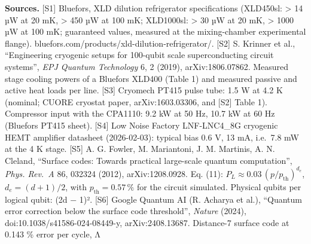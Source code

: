 \documentclass[
]{article}
\begin{document}
\textbf{Sources.} {[}S1{]} Bluefors, XLD dilution refrigerator
specifications (XLD450sl: \textgreater{} 14 µW at 20 mK, \textgreater{}
450 µW at 100 mK; XLD1000sl: \textgreater{} 30 µW at 20 mK,
\textgreater{} 1000 µW at 100 mK; guaranteed values, measured at the
mixing-chamber experimental flange).
b\allowbreak{}l\allowbreak{}u\allowbreak{}e\allowbreak{}f\allowbreak{}o\allowbreak{}r\allowbreak{}s\allowbreak{}.\allowbreak{}c\allowbreak{}o\allowbreak{}m\allowbreak{}/\allowbreak{}p\allowbreak{}r\allowbreak{}o\allowbreak{}d\allowbreak{}u\allowbreak{}c\allowbreak{}t\allowbreak{}s\allowbreak{}/\allowbreak{}x\allowbreak{}l\allowbreak{}d\allowbreak{}-\allowbreak{}d\allowbreak{}i\allowbreak{}l\allowbreak{}u\allowbreak{}t\allowbreak{}i\allowbreak{}o\allowbreak{}n\allowbreak{}-\allowbreak{}r\allowbreak{}e\allowbreak{}f\allowbreak{}r\allowbreak{}i\allowbreak{}g\allowbreak{}e\allowbreak{}r\allowbreak{}a\allowbreak{}t\allowbreak{}o\allowbreak{}r\allowbreak{}/\allowbreak{}.
{[}S2{]} S. Krinner et al., ``Engineering cryogenic setups for 100-qubit
scale superconducting circuit systems'', \emph{EPJ Quantum Technology}
6, 2 (2019), arXiv:1806.07862. Measured stage cooling powers of a
Bluefors XLD400 (Table 1) and measured passive and active heat loads per
line. {[}S3{]} Cryomech PT415 pulse tube: 1.5 W at 4.2 K (nominal; CUORE
cryostat paper, arXiv:1603.03306, and {[}S2{]} Table 1). Compressor
input with the CPA1110: 9.2 kW at 50 Hz, 10.7 kW at 60 Hz (Bluefors
PT415 sheet). {[}S4{]} Low Noise Factory LNF-LNC4\_8G cryogenic HEMT
amplifier datasheet (2026-02-03): typical bias 0.6 V, 13 mA, i.e.~7.8 mW
at the 4 K stage. {[}S5{]} A. G. Fowler, M. Mariantoni, J. M. Martinis,
A. N. Cleland, ``Surface codes: Towards practical large-scale quantum
computation'', \emph{Phys. Rev.~A} 86, 032324 (2012), arXiv:1208.0928.
Eq. (11): \(P_L \approx 0.03\,(p/p_{\mathrm{th}})^{d_e}\),
\(d_e = (d+1)/2\), with \(p_{\mathrm{th}} = 0.57\,\%\) for the circuit
simulated. Physical qubits per logical qubit: (2d − 1)². {[}S6{]} Google
Quantum AI (R. Acharya et al.), ``Quantum error correction below the
surface code threshold'', \emph{Nature} (2024),
d\allowbreak{}o\allowbreak{}i\allowbreak{}:\allowbreak{}1\allowbreak{}0\allowbreak{}.\allowbreak{}1\allowbreak{}0\allowbreak{}3\allowbreak{}8\allowbreak{}/\allowbreak{}s\allowbreak{}4\allowbreak{}1\allowbreak{}5\allowbreak{}8\allowbreak{}6\allowbreak{}-\allowbreak{}0\allowbreak{}2\allowbreak{}4\allowbreak{}-\allowbreak{}0\allowbreak{}8\allowbreak{}4\allowbreak{}4\allowbreak{}9\allowbreak{}-\allowbreak{}y\allowbreak{},
arXiv:2408.13687. Distance-7 surface code at 0.143 \% error per cycle, Λ
\end{document}
